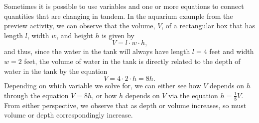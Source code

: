 \documentclass{ximera}
\begin{document}
Sometimes it is possible to use variables and one or more equations to connect quantities that are changing in tandem.  In the aquarium example from the preview activity, we can observe that the volume, $V$, of a rectangular box that has length $l$, width $w$, and height $h$ is given by%
\begin{equation*}
V = l \cdot w \cdot h\text{,}
\end{equation*}
and thus, since the water in the tank will always have length $l = 4$ feet and width $w = 2$ feet, the volume of water in the tank is directly related to the depth of water in the tank by the equation%
\begin{equation*}
V = 4 \cdot 2 \cdot h = 8h\text{.}
\end{equation*}
Depending on which variable we solve for, we can either see how $V$ depends on $h$ through the equation $V = 8h$, or how $h$ depends on $V$ via the equation $h = \frac{1}{8}V$.  From either perspective, we observe that as depth or volume increases, so must volume or depth correspondingly increase.%
\end{document}
